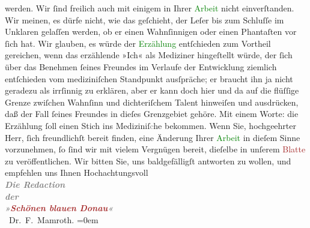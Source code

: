                werden.\pend
           \pstart
           Wir ſind freilich auch mit einigem in Ihrer \textcolor{green}{Arbeit}{} nicht {\pb}einverſtanden.
               Wir meinen, es dürfe nicht, wie das geſchieht, der Leſer bis zum Schluſſe im Unklaren
               gelaſſen werden, ob er einen Wahnſinnigen oder einen Phantaſten vor ſich hat. Wir
               glauben, es würde der \textcolor{green}{Erzählung}{} entſchieden zum Vortheil gereichen, wenn das erzählende »Ich« als
               Mediziner hingeſtellt würde, der ſich über das Benehmen ſeines Freundes im Verlaufe
               der Entwicklung ziemlich entſchieden vom mediziniſchen Standpunkt ausſpräche; er
               braucht ihn ja nicht geradezu als irrſinnig zu erklären, aber er kann doch hier und
               da auf die flüſſige Grenze zwiſchen Wahnſinn und dichteriſchem Talent hinweiſen und
               ausdrücken, daß {\pb}der Fall ſeines Freundes in dieſes
               Grenzgebiet gehöre. Mit einem Worte: die Erzählung ſoll einen Stich ins
                  Mediziniſ\textcolor{gray}{c}he bekommen.\pend
           \pstart
           Wenn Sie, hochgeehrter Herr, ſich freundlichſt bereit finden, eine Änderung Ihrer \textcolor{green}{Arbeit}{} in dieſem Sinne
               vorzunehmen, ſo ſind wir mit vielem Vergnügen bereit, dieſelbe in unſerem \textcolor{brown}{Blatte}{} zu veröffentlichen.\pend
           \pstart
           Wir bitten Sie, uns baldgefälligſt antworten zu wollen, und empfehlen {\pb}uns Ihnen\pend
           \pstart
           Hochachtungsvoll{\\[\baselineskip]}\textcolor{gray}{\textbf{\textit{Die Redaction}}}{\\[\baselineskip]}\textcolor{gray}{\textbf{\textit{der}}}{\\[\baselineskip]}\textcolor{gray}{\textbf{\textit{»\textcolor{brown}{Schönen blauen Donau}{}\ledrightnote{\textcolor{brown}{An der schönen blauen Donau}}«}}}{\\[\baselineskip]}\spacefill\mbox{\label{K_L02551-1v}\label{K_L02551-1h} Dr. F. Mamroth.}\pend
           \leftskip=0em{}\endnumbering{}  
      